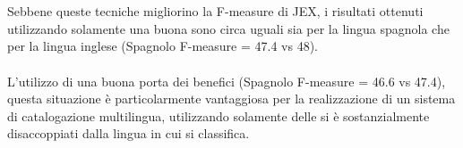 \documentclass{article}
\theoremstyle{plain}
\theoremstyle{definition}
\begin{document}
\\
\\
Sebbene queste tecniche migliorino la F-measure di JEX, i risultati ottenuti utilizzando solamente una buona  sono circa uguali sia per la lingua spagnola che per la lingua inglese (Spagnolo F-measure = 47.4 vs 48).
\\
\\
L'utilizzo di una buona  porta dei benefici (Spagnolo F-measure = 46.6 vs 47.4), questa situazione è particolarmente vantaggiosa per la realizzazione di un sistema di catalogazione multilingua, utilizzando solamente delle  si è sostanzialmente disaccoppiati dalla lingua in cui si classifica.
\footnotemark
{}  
\end{document}
